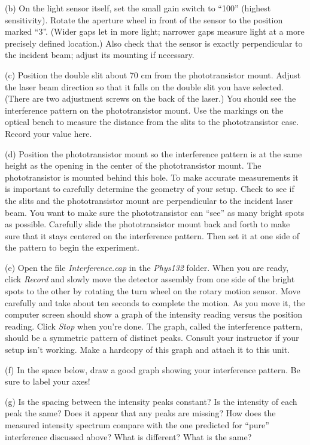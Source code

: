 (b) On the light sensor itself, set the small gain switch to “100” (highest sensitivity). Rotate the aperture wheel
in front of the sensor to the position marked “3”. (Wider gaps let in more light; narrower gaps measure light
at a more precisely defined location.) Also check that the sensor is exactly perpendicular to the incident beam;
adjust its mounting if necessary.

(c) Position the double slit about 70 cm from the phototransistor mount. Adjust 
the laser beam direction so that it falls on the double slit you have selected. 
(There are two adjustment screws on the back of the laser.) 
You should see the interference pattern on the phototransistor mount. 
Use the markings on the optical bench to measure the distance from the slits
to the phototransistor case.
Record your value here.
\vspace{10mm}

(d) Position the phototransistor mount so the interference pattern
is at the same height as the opening in the center of the phototransistor mount. 
The phototransistor is mounted behind this hole. 
To make accurate measurements it is important to carefully determine the geometry of your setup. 
Check to see if the slits and the phototransistor mount are perpendicular to the incident
laser beam.  You want to make sure the phototransistor can {}``see'' as many
bright spots as possible. Carefully slide the phototransistor mount 
back and forth to make sure that it stays centered on the interference pattern. 
Then set it at one side of the pattern to begin the experiment.

(e) Open the file {\it Interference.cap} in the {\it Phys132} folder. 
When you are ready, click {\it Record} and slowly move the
detector assembly from one side of the bright spots to the other by rotating the turn wheel on the rotary motion
sensor. Move carefully and take about ten seconds to complete the motion. As you move it, the computer screen
should show a graph of the intensity reading versus the position reading. Click {\it Stop} when you’re done. The
graph, called the interference pattern, should be a symmetric pattern of distinct peaks. Consult your instructor
if your setup isn’t working.
Make a hardcopy of this graph and attach it to this unit.

(f) In the space below, draw a good graph showing your interference pattern. Be sure to label your axes!
\vspace{25mm}

(g) Is the spacing between the intensity peaks constant? Is the intensity
of each peak the same? Does it appear that any peaks are missing?
How does the measured intensity spectrum compare with the one predicted
for {}``pure'' interference discussed above? What is different?
What is the same?
\vspace{30mm}

